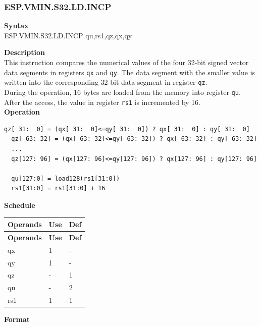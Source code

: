 \newpage
\subsubsection{ESP.VMIN.S32.LD.INCP}\label{instruction:ESPVMINS32LDINCP}
\textbf{Syntax}\\
ESP.VMIN.S32.LD.INCP qu,rs1,qz,qx,qy

\textbf{Description}\\
This instruction compares the numerical values of the four 32-bit signed vector data segments in registers \lstinline{qx} and \lstinline{qy}. The data segment with the smaller value is written into the corresponding 32-bit data segment in register \lstinline{qz}.\\During the operation, 16 bytes are loaded from the memory into register \lstinline{qu}. After the access, the value in register \lstinline{rs1} is incremented by 16.\\
\textbf{Operation}
\begin{lstlisting}[escapeinside=`?]
  qz[ 31:  0] = (qx[ 31:  0]<=qy[ 31:  0]) ? qx[ 31:  0] : qy[ 31:  0]
  qz[ 63: 32] = (qx[ 63: 32]<=qy[ 63: 32]) ? qx[ 63: 32] : qy[ 63: 32]
  ...
  qz[127: 96] = (qx[127: 96]<=qy[127: 96]) ? qx[127: 96] : qy[127: 96]

  qu[127:0] = load128(rs1[31:0])
  rs1[31:0] = rs1[31:0] + 16
\end{lstlisting}


\textbf{Schedule}\\
\begin{longtable}[c]{|l|l|l|}
    \hline
    \rowcolor{lightgray}
    \textbf{Operands} & \textbf{Use} & \textbf{Def} \\\hline
    \endfirsthead
    \hline
    \rowcolor{lightgray}
     \textbf{Operands} & \textbf{Use} & \textbf{Def} \\\hline
    \endhead
    \hline
    \endfoot

    qx & 1 & - \\\hline
  qy & 1 & - \\\hline
     qz & - & 1 \\\hline
     qu & - & 2 \\\hline
     rs1 & 1 & 1

\end{longtable}

\textbf{Format}\\

